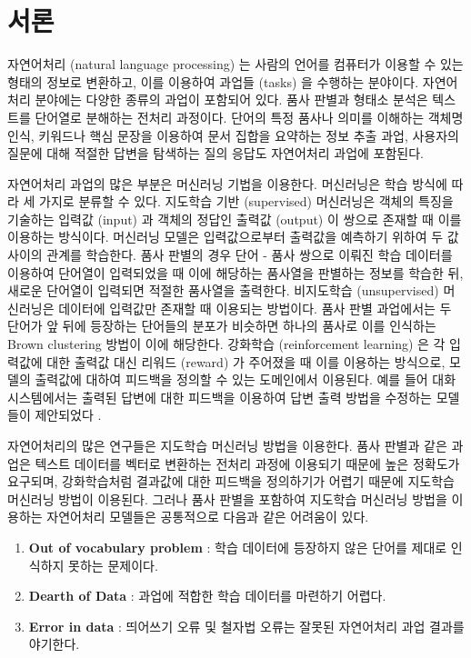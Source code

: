 \documentclass[oneside, ko,phd]{snuthesis_utf8_kor}
\begin{document}

\chapter{서론}\label{introduction}
자연어처리 (natural language processing) 는 사람의 언어를 컴퓨터가 이용할 수 있는 형태의 정보로 변환하고, 이를 이용하여 과업들 (tasks) 을 수행하는 분야이다.
자연어처리 분야에는 다양한 종류의 과업이 포함되어 있다.
품사 판별과 형태소 분석은 텍스트를 단어열로 분해하는 전처리 과정이다.
단어의 특정 품사나 의미를 이해하는 객체명 인식, 키워드나 핵심 문장을 이용하여 문서 집합을 요약하는 정보 추출 과업, 사용자의 질문에 대해 적절한 답변을 탐색하는 질의 응답도 자연어처리 과업에 포함된다.

자연어처리 과업의 많은 부분은 머신러닝 기법을 이용한다.
머신러닝은 학습 방식에 따라 세 가지로 분류할 수 있다.
지도학습 기반 (supervised) 머신러닝은 객체의 특징을 기술하는 입력값 (input) 과 객체의 정답인 출력값 (output) 이 쌍으로 존재할 때 이를 이용하는 방식이다.
머신러닝 모델은 입력값으로부터 출력값을 예측하기 위하여 두 값 사이의 관계를 학습한다.
품사 판별의 경우 단어 - 품사 쌍으로 이뤄진 학습 데이터를 이용하여 단어열이 입력되었을 때 이에 해당하는 품사열을 판별하는 정보를 학습한 뒤, 새로운 단어열이 입력되면 적절한 품사열을 출력한다.
비지도학습 (unsupervised) 머신러닝은 데이터에 입력값만 존재할 때 이용되는 방법이다.
품사 판별 과업에서는 두 단어가 앞 뒤에 등장하는 단어들의 분포가 비슷하면 하나의 품사로 이를 인식하는 Brown clustering \cite{brown1992class} 방법이 이에 해당한다.
강화학습 (reinforcement learning) 은 각 입력값에 대한 출력값 대신 리워드 (reward) 가 주어졌을 때 이를 이용하는 방식으로, 모델의 출력값에 대하여 피드백을 정의할 수 있는 도메인에서 이용된다.
예를 들어 대화 시스템에서는 출력된 답변에 대한 피드백을 이용하여 답변 출력 방법을 수정하는 모델들이 제안되었다 \cite{mo2018personalizing, singh2000reinforcement, li2016deep}.

자연어처리의 많은 연구들은 지도학습 머신러닝 방법을 이용한다.
품사 판별과 같은 과업은 텍스트 데이터를 벡터로 변환하는 전처리 과정에 이용되기 때문에 높은 정확도가 요구되며, 강화학습처럼 결과값에 대한 피드백을 정의하기가 어렵기 때문에 지도학습 머신러닝 방법이 이용된다.
그러나 품사 판별을 포함하여 지도학습 머신러닝 방법을 이용하는 자연어처리 모델들은 공통적으로 다음과 같은 어려움이 있다.

\begin{enumerate}
    \item \textbf{Out of vocabulary problem} : 학습 데이터에 등장하지 않은 단어를 제대로 인식하지 못하는 문제이다.
    \item \textbf{Dearth of Data} : 과업에 적합한 학습 데이터를 마련하기 어렵다.
    \item \textbf{Error in data} : 띄어쓰기 오류 및 철자법 오류는 잘못된 자연어처리 과업 결과를 야기한다.
\end{enumerate}
\end{document}
